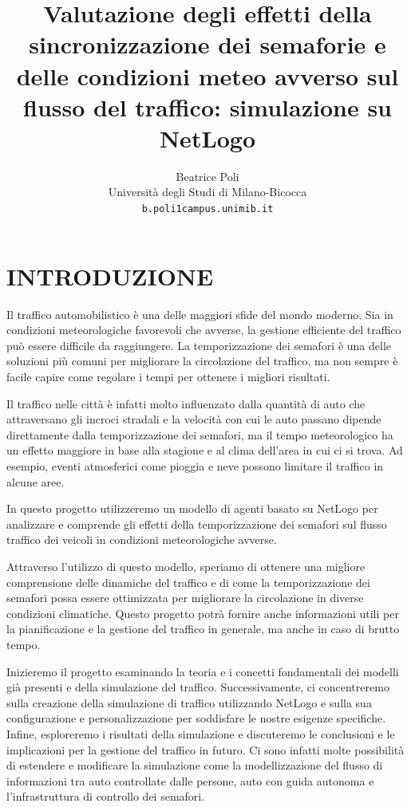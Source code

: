 \documentclass[11pt]{article}
\title{\liningfont Valutazione degli effetti della sincronizzazione dei semaforie e delle condizioni meteo avverso sul flusso del traffico: simulazione su NetLogo}
\author{\liningfont Beatrice Poli \\ Università degli Studi di Milano-Bicocca \\ \texttt{b.poli1campus.unimib.it}}
\date{}           %
\begin{document}
\maketitle
\thispagestyle{empty}
\pagestyle{empty}




\section{INTRODUZIONE}
Il traffico automobilistico è una delle maggiori sfide del mondo moderno. Sia in condizioni meteorologiche favorevoli che avverse, la gestione efficiente del traffico può essere difficile da raggiungere. La temporizzazione dei semafori è una delle soluzioni più comuni per migliorare la circolazione del traffico, ma non sempre è facile capire come regolare i tempi per ottenere i migliori risultati.

Il traffico nelle città è infatti molto influenzato dalla quantità di auto che attraversano gli incroci stradali e la velocità con cui le auto passano dipende direttamente dalla temporizzazione dei semafori, ma il tempo meteorologico ha un effetto maggiore in base alla stagione e al clima dell'area in cui ci si trova. Ad esempio, eventi atmosferici come pioggia e neve possono limitare il traffico in alcune aree.

In questo progetto utilizzeremo un modello di agenti basato su NetLogo per analizzare e comprende gli effetti della temporizzazione dei semafori sul flusso traffico dei veicoli in condizioni meteorologiche avverse.

Attraverso l'utilizzo di questo modello, speriamo di ottenere una migliore comprensione delle dinamiche del traffico e di come la temporizzazione dei semafori possa essere ottimizzata per migliorare la circolazione in diverse condizioni climatiche. Questo progetto potrà fornire anche informazioni utili per la pianificazione e la gestione del traffico in generale, ma anche in caso di brutto tempo.

Inizieremo il progetto esaminando la teoria e i concetti fondamentali dei modelli già presenti e della simulazione del traffico. Successivamente, ci concentreremo sulla creazione della simulazione di traffico utilizzando NetLogo e sulla sua configurazione e personalizzazione per soddisfare le nostre esigenze specifiche. Infine, esploreremo i risultati della simulazione e discuteremo le conclusioni e le implicazioni per la gestione del traffico in futuro. Ci sono infatti molte possibilità di estendere e modificare la simulazione come la modellizzazione del flusso di informazioni tra auto controllate dalle persone, auto con guida autonoma e l'infrastruttura di controllo dei semafori.
\end{document}

